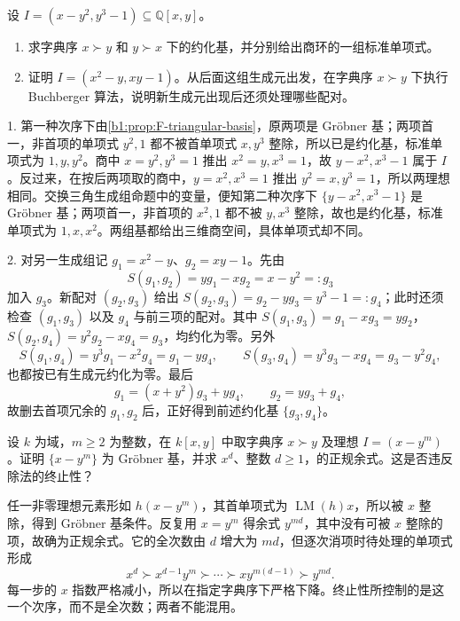 \begin{exercise}\label{b1:ex:F-change-order-cubic}
	设 \(I=(x-y^2,y^3-1)\subseteq\mathbb Q[x,y]\)。
	\begin{enumerate}
		\item 求字典序 \(x\succ y\) 和 \(y\succ x\) 下的约化基，并分别给出商环的一组标准单项式。
		\item 证明 \(I=(x^2-y,xy-1)\)。从后面这组生成元出发，在字典序 \(x\succ y\) 下执行 Buchberger 算法，说明新生成元出现后还须处理哪些配对。
	\end{enumerate}
\end{exercise}
\begin{solution}
	1. 第一种次序下由\cref{b1:prop:F-triangular-basis}，原两项是 Gröbner 基；两项首一，非首项的单项式 \(y^2,1\) 都不被首单项式 \(x,y^3\) 整除，所以已是约化基，标准单项式为 \(1,y,y^2\)。商中 \(x=y^2,y^3=1\) 推出 \(x^2=y,x^3=1\)，故 \(y-x^2,x^3-1\) 属于 \(I\)。反过来，在按后两项取的商中，\(y=x^2,x^3=1\) 推出 \(y^2=x,y^3=1\)，所以两理想相同。交换三角生成组命题中的变量，便知第二种次序下 \(\{y-x^2,x^3-1\}\) 是 Gröbner 基；两项首一，非首项的 \(x^2,1\) 都不被 \(y,x^3\) 整除，故也是约化基，标准单项式为 \(1,x,x^2\)。两组基都给出三维商空间，具体单项式却不同。

	2. 对另一生成组记 \(g_1=x^2-y\)、\(g_2=xy-1\)。先由
	\[
		S(g_1,g_2)=yg_1-xg_2=x-y^2=:g_3
	\]
	加入 \(g_3\)。新配对 \((g_2,g_3)\) 给出 \(S(g_2,g_3)=g_2-yg_3=y^3-1=:g_4\)；此时还须检查 \((g_1,g_3)\) 以及 \(g_4\) 与前三项的配对。其中 \(S(g_1,g_3)=g_1-xg_3=yg_2\)，\(S(g_2,g_4)=y^2g_2-xg_4=g_3\)，均约化为零。另外
	\[
		S(g_1,g_4)=y^3g_1-x^2g_4=g_1-yg_4,\qquad S(g_3,g_4)=y^3g_3-xg_4=g_3-y^2g_4,
	\]
	也都按已有生成元约化为零。最后
	\[
		g_1=(x+y^2)g_3+yg_4,\qquad g_2=yg_3+g_4,
	\]
	故删去首项冗余的 \(g_1,g_2\) 后，正好得到前述约化基 \(\{g_3,g_4\}\)。
\end{solution}

\begin{exercise}\label{b1:ex:F-normal-degree-increase}
	设 \(k\) 为域，\(m\ge2\) 为整数，在 \(k[x,y]\) 中取字典序 \(x\succ y\) 及理想 \(I=(x-y^m)\)。证明 \(\{x-y^m\}\) 为 Gröbner 基，并求 \(x^d\)、整数 \(d\ge1\)，的正规余式。这是否违反除法的终止性？
\end{exercise}
\begin{solution}
	任一非零理想元素形如 \(h(x-y^m)\)，其首单项式为 \(\operatorname{LM}(h)x\)，所以被 \(x\) 整除，得到 Gröbner 基条件。反复用 \(x=y^m\) 得余式 \(y^{md}\)，其中没有可被 \(x\) 整除的项，故确为正规余式。它的全次数由 \(d\) 增大为 \(md\)，但逐次消项时待处理的单项式形成
	\[
		x^d\succ x^{d-1}y^m\succ\cdots\succ xy^{m(d-1)}\succ y^{md}.
	\]
	每一步的 \(x\) 指数严格减小，所以在指定字典序下严格下降。终止性所控制的是这一个次序，而不是全次数；两者不能混用。
\end{solution}


